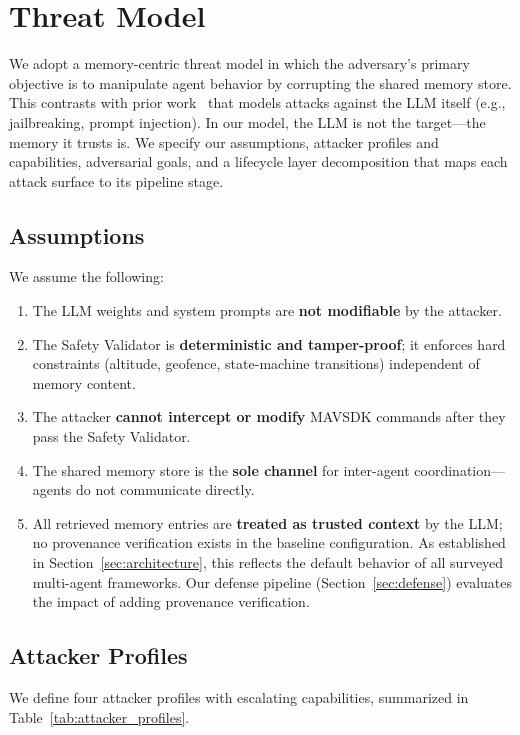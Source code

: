 \documentclass[conference]{IEEEtran}
\begin{document}
\section{Threat Model}
\label{sec:threat_model}

We adopt a memory-centric threat model in which the adversary's primary objective is to manipulate agent behavior by corrupting the shared memory store. This contrasts with prior work~\cite{poisonedrag, agentpoison} that models attacks against the LLM itself (e.g., jailbreaking, prompt injection). In our model, the LLM is not the target---the memory it trusts is. We specify our assumptions, attacker profiles and capabilities, adversarial goals, and a lifecycle layer decomposition that maps each attack surface to its pipeline stage.

\subsection{Assumptions}
We assume the following:
\begin{enumerate}
    \item The LLM weights and system prompts are \textbf{not modifiable} by the attacker.
    \item The Safety Validator is \textbf{deterministic and tamper-proof}; it enforces hard constraints (altitude, geofence, state-machine transitions) independent of memory content.
    \item The attacker \textbf{cannot intercept or modify} MAVSDK commands after they pass the Safety Validator.
    \item The shared memory store is the \textbf{sole channel} for inter-agent coordination---agents do not communicate directly.
    \item All retrieved memory entries are \textbf{treated as trusted context} by the LLM; no provenance verification exists in the baseline configuration. As established in Section~\ref{sec:architecture}, this reflects the default behavior of all surveyed multi-agent frameworks. Our defense pipeline (Section~\ref{sec:defense}) evaluates the impact of adding provenance verification.
\end{enumerate}

\subsection{Attacker Profiles}
We define four attacker profiles with escalating capabilities, summarized in Table~\ref{tab:attacker_profiles}.
\end{document}

